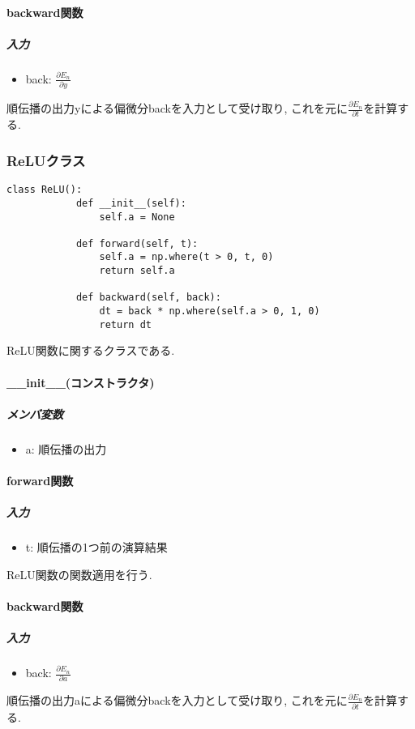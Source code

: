 \documentclass[a4j, titlepage]{jarticle}
\begin{document}
        \paragraph*{backward関数}
            \subparagraph*{入力}
            \begin{itemize}
                \item back: \(\displaystyle \frac{\partial E_n}{\partial y}\)
            \end{itemize}
            順伝播の出力yによる偏微分backを入力として受け取り, これを元に\(\displaystyle \frac{\partial E_n}{\partial t}\)を計算する.

    \subsubsection{ReLUクラス}
        \begin{lstlisting}[caption=ReLU関数の計算 ,label=fuga]
        class ReLU():
            def __init__(self):
                self.a = None

            def forward(self, t):
                self.a = np.where(t > 0, t, 0)
                return self.a

            def backward(self, back):
                dt = back * np.where(self.a > 0, 1, 0)
                return dt
        \end{lstlisting}
        ReLU関数に関するクラスである.
        \paragraph*{\_\_init\_\_(コンストラクタ)}
            \subparagraph*{メンバ変数}
            \begin{itemize}
                \item a: 順伝播の出力
            \end{itemize}
        \paragraph*{forward関数}
            \subparagraph*{入力}
            \begin{itemize}
                \item t: 順伝播の1つ前の演算結果
            \end{itemize}
            ReLU関数の関数適用を行う.
        \paragraph*{backward関数}
            \subparagraph*{入力}
            \begin{itemize}
                \item back: \(\displaystyle \frac{\partial E_n}{\partial a}\)
            \end{itemize}
            順伝播の出力aによる偏微分backを入力として受け取り, これを元に\(\displaystyle \frac{\partial E_n}{\partial t}\)を計算する.
\end{document}
